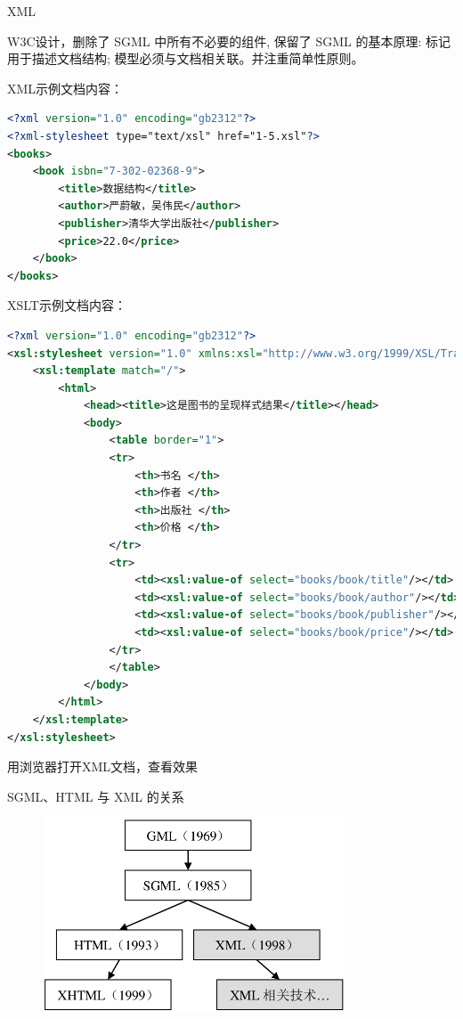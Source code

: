 \begin{frame}{XML}
\par W3C设计，删除了 SGML 中所有不必要的组件, 保留了 SGML 的基本原理: 标记用于描述文档结构; 模型必须与文档相关联。并注重简单性原则。
\par XML示例文档内容：
\begin{lstlisting}[tabsize=8,language=XML]
<?xml version="1.0" encoding="gb2312"?>
<?xml-stylesheet type="text/xsl" href="1-5.xsl"?>
<books>
    <book isbn="7-302-02368-9">
        <title>数据结构</title>
        <author>严蔚敏，吴伟民</author>
        <publisher>清华大学出版社</publisher>
        <price>22.0</price>
    </book>
</books>
\end{lstlisting}

\par XSLT示例文档内容：
\begin{lstlisting}[tabsize=8, basicstyle=\small\tt, language=XML]
<?xml version="1.0" encoding="gb2312"?>
<xsl:stylesheet version="1.0" xmlns:xsl="http://www.w3.org/1999/XSL/Transform">
    <xsl:template match="/">
        <html>
            <head><title>这是图书的呈现样式结果</title></head>
            <body>
                <table border="1">
                <tr>
                    <th>书名 </th>
                    <th>作者 </th>
                    <th>出版社 </th>
                    <th>价格 </th>						
                </tr>					
                <tr>
                    <td><xsl:value-of select="books/book/title"/></td>
                    <td><xsl:value-of select="books/book/author"/></td>
                    <td><xsl:value-of select="books/book/publisher"/></td>
                    <td><xsl:value-of select="books/book/price"/></td>						
                </tr>
                </table>
            </body>
        </html>
    </xsl:template>
</xsl:stylesheet>
\end{lstlisting}

\par {\color{red}用浏览器打开XML文档，查看效果}
\end{frame}


\begin{frame}[fragile]{SGML、HTML 与 XML 的关系}
\begin{figure}
	\includegraphics[width=0.8\textwidth]{figure/intro-1.png}
\end{figure}
\end{frame}


